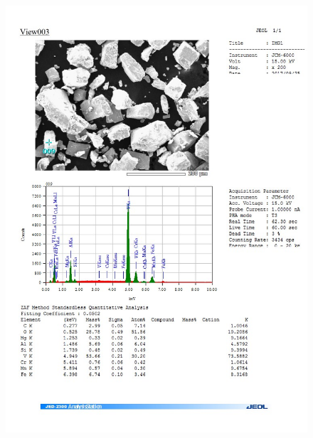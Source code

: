 \documentclass[12pt]{article}
\begin{document}
\begin{figure}[H]
	\includegraphics[width = \linewidth]{./pictures/dot_spec_9.jpg}
\end{figure}
\end{document}
